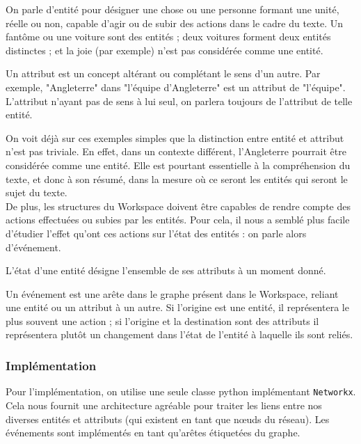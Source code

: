 \documentclass[a4paper, 12pt]{article}
\newcommand{\pyt}[1]{\texttt{#1}}%
\begin{document}
\begin{definition}[Entité]
On parle d'entité pour désigner une chose ou une personne formant une unité, réelle ou non, capable d'agir ou de subir des actions dans le cadre du texte. Un fantôme ou une voiture sont des entités ; deux voitures forment deux entités distinctes ; et la joie (par exemple) n'est pas considérée comme une entité.
\end{definition}

\begin{definition}[Attribut]
Un attribut est un concept altérant ou complétant le sens d'un autre. Par exemple, "Angleterre" dans "l'équipe d'Angleterre" est un attribut de "l'équipe". L'attribut n'ayant pas de sens à lui seul, on parlera toujours de l'attribut de telle entité.
\end{definition}

On voit déjà sur ces exemples simples que la distinction entre entité et attribut n'est pas triviale. En effet, dans un contexte différent, l'Angleterre pourrait être considérée comme une entité. Elle est pourtant essentielle à la compréhension du texte, et donc à son résumé, dans la mesure où ce seront les entités qui seront le sujet du texte.\\

De plus, les structures du Workspace doivent être capables de rendre compte des actions effectuées ou subies par les entités. Pour cela, il nous a semblé plus facile d'étudier l'effet qu'ont ces actions sur l'état des entités : on parle alors d'événement.

\begin{definition}[État]
L'état d'une entité désigne l'ensemble de ses attributs à un moment donné.
\end{definition}
\begin{definition}[Événement]
Un événement est une arête dans le graphe présent dans le Workspace, reliant une entité ou un attribut à un autre. Si l'origine est une entité, il représentera le plus souvent une action ; si l'origine et la destination sont des attributs il représentera plutôt un changement dans l'état de l'entité à laquelle ils sont reliés.
\end{definition}

\subsubsection{Implémentation}

Pour l'implémentation, on utilise une seule classe python implémentant \pyt{Networkx}. Cela nous fournit une architecture agréable pour traiter les liens entre nos diverses entités et attributs (qui existent en tant que nœuds du réseau). Les événements sont implémentés en tant qu'arêtes étiquetées du graphe.
\end{document}
